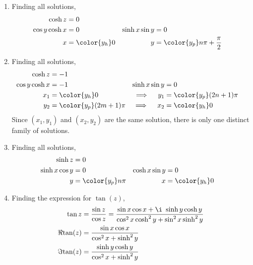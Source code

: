 \begin{enumerate}
    \item Finding all solutions,
          \begin{align}
              \cosh z        & = 0                                  \\
              \cos y \cosh x & = 0                                &
              \sinh x \sin y & = 0                                  \\
              x              & = \color{y_h} 0                    &
              y              & = \color{y_p} n\pi + \frac{\pi}{2}
          \end{align}

    \item Finding all solutions,
          \begin{align}
              \cosh z            & = -1                        \\
              \cos y \cosh x     & = -1                      &
              \sinh x \sin y     & = 0                         \\
              x_1                & = \color{y_h} 0           &
              \implies \quad y_1 & = \color{y_p} (2n + 1)\pi   \\
              y_2                & = \color{y_p} (2m + 1)\pi &
              \implies \quad x_2 & = \color{y_h} 0             \\
          \end{align}
          Since $ (x_1, y_1) $ and $ (x_2, y_2) $ are the same solution, there is only
          one distinct family of solutions.

    \item Finding all solutions,
          \begin{align}
              \sinh z        & = 0                  \\
              \sinh x \cos y & = 0                &
              \cosh x \sin y & = 0                  \\
              y              & = \color{y_p} n\pi &
              x              & = \color{y_h} 0
          \end{align}

    \item Finding the expression for $ \tan(z) $,
          \begin{align}
              \tan z       & = \frac{\sin z}{\cos z} =
              \frac{\sin x \cos x + \i\ \sinh y \cosh y}
              {\cos^2 x \cosh^2 y + \sin^2 x \sinh^2 y}                     \\
              \Re{\tan(z)} & = \frac{\sin x \cos x}{\cos^2 x + \sinh^2 y}   \\
              \Im{\tan(z)} & = \frac{\sinh y \cosh y}{\cos^2 x + \sinh^2 y}
          \end{align}

\end{enumerate}